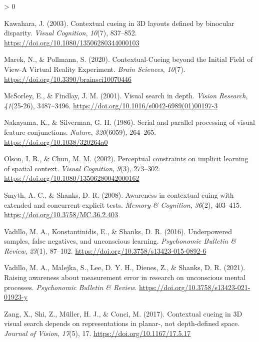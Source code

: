 \documentclass[
  english,
  man,floatsintext]{apa7}
\newlength{\cslhangindent}
\newenvironment{CSLReferences}[2] %
 {%
  \setlength{\parindent}{0pt}
  \ifodd #1 \everypar{\setlength{\hangindent}{\cslhangindent}}\ignorespaces\fi
  \ifnum #2 > 0
  \setlength{\parskip}{#2\baselineskip}
  \fi
 }%
 {}
\begin{document}
\begin{CSLReferences}{1}{0}
\leavevmode\hypertarget{ref-kawahara2003}{}%
Kawahara, J. (2003). Contextual cueing in {3D} layouts defined by binocular disparity. \emph{Visual Cognition}, \emph{10}(7), 837--852. \url{https://doi.org/10.1080/13506280344000103}

\leavevmode\hypertarget{ref-marek2020}{}%
Marek, N., \& Pollmann, S. (2020). Contextual-{Cueing} beyond the {Initial Field} of {View}-{A Virtual Reality Experiment}. \emph{Brain Sciences}, \emph{10}(7). \url{https://doi.org/10.3390/brainsci10070446}

\leavevmode\hypertarget{ref-mcsorley2001}{}%
McSorley, E., \& Findlay, J. M. (2001). Visual search in depth. \emph{Vision Research}, \emph{41}(25-26), 3487--3496. \url{https://doi.org/10.1016/s0042-6989(01)00197-3}

\leavevmode\hypertarget{ref-nakayama1986}{}%
Nakayama, K., \& Silverman, G. H. (1986). Serial and parallel processing of visual feature conjunctions. \emph{Nature}, \emph{320}(6059), 264--265. \url{https://doi.org/10.1038/320264a0}

\leavevmode\hypertarget{ref-olson2002}{}%
Olson, I. R., \& Chun, M. M. (2002). Perceptual constraints on implicit learning of spatial context. \emph{Visual Cognition}, \emph{9}(3), 273--302. \url{https://doi.org/10.1080/13506280042000162}

\leavevmode\hypertarget{ref-smyth2008}{}%
Smyth, A. C., \& Shanks, D. R. (2008). Awareness in contextual cuing with extended and concurrent explicit tests. \emph{Memory \& Cognition}, \emph{36}(2), 403--415. \url{https://doi.org/10.3758/MC.36.2.403}

\leavevmode\hypertarget{ref-vadillo2016}{}%
Vadillo, M. A., Konstantinidis, E., \& Shanks, D. R. (2016). Underpowered samples, false negatives, and unconscious learning. \emph{Psychonomic Bulletin \& Review}, \emph{23}(1), 87--102. \url{https://doi.org/10.3758/s13423-015-0892-6}

\leavevmode\hypertarget{ref-vadillo2021}{}%
Vadillo, M. A., Malejka, S., Lee, D. Y. H., Dienes, Z., \& Shanks, D. R. (2021). Raising awareness about measurement error in research on unconscious mental processes. \emph{Psychonomic Bulletin \& Review}. \url{https://doi.org/10.3758/s13423-021-01923-y}

\leavevmode\hypertarget{ref-zang2017}{}%
Zang, X., Shi, Z., Müller, H. J., \& Conci, M. (2017). Contextual cueing in 3D visual search depends on representations in planar-, not depth-defined space. \emph{Journal of Vision}, \emph{17}(5), 17. \url{https://doi.org/10.1167/17.5.17}

\end{CSLReferences}
\end{document}

